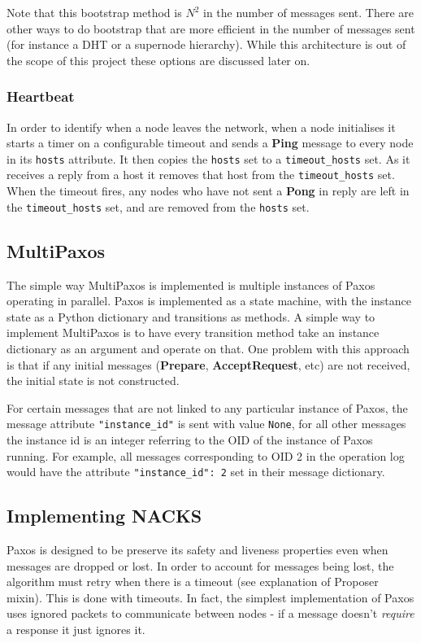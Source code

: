 \documentclass[12pt,twoside,notitlepage]{report}
\newcommand{\msg}[1] {{\bf #1}}         %
\begin{document}
Note that this bootstrap method is $N^2$ in the number of messages sent. There are other ways to
do bootstrap that are more efficient in the number of messages sent (for instance a DHT or a
supernode hierarchy). While this architecture is out of the scope of this project these options are
discussed later on.

\subsubsection{Heartbeat}

In order to identify when a node leaves the network, when a node initialises it starts a timer on
a configurable timeout and sends a \msg{Ping} message to every node in its \verb+hosts+ attribute.
It then copies the \verb+hosts+ set to a \verb+timeout_hosts+ set. As it receives a reply from a
host it removes that host from the \verb+timeout_hosts+ set. When the timeout fires, any nodes who
have not sent a \msg{Pong} in reply are left in the \verb+timeout_hosts+ set, and are removed from
the \verb+hosts+ set.

\subsection{MultiPaxos}

The simple way MultiPaxos is implemented is multiple instances of Paxos operating in parallel.
Paxos is implemented as a state machine, with the instance state as a Python dictionary and
transitions as methods. A simple way to implement MultiPaxos is to have every transition method
take an instance dictionary as an argument and operate on that. One problem with this approach is
that if any initial messages (\msg{Prepare}, \msg{AcceptRequest}, etc) are not received, the
initial state is not constructed.

For certain messages that are not linked to any particular instance of Paxos, the message
attribute \verb+"instance_id"+ is sent with value \verb+None+, for all other messages the instance
id is an integer referring to the OID of the instance of Paxos running. For example, all messages
corresponding to OID 2 in the operation log would have the attribute \verb+"instance_id": 2+ set
in their message dictionary.

\subsection{Implementing NACKS}

Paxos is designed to be preserve its safety and liveness properties even when messages are dropped
or lost. In order to account for messages being lost, the algorithm must retry when there is a
timeout (see explanation of Proposer mixin). This is done with timeouts. In fact, the simplest
implementation of Paxos uses ignored packets to communicate between nodes - if a message doesn't
\emph{require} a response it just ignores it.
\end{document}
